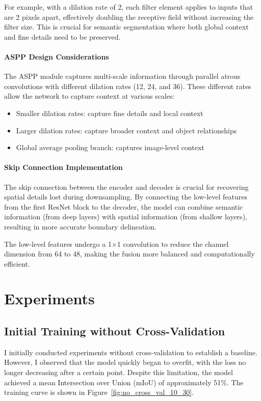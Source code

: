 \documentclass[]{article}
\begin{document}
For example, with a dilation rate of 2, each filter element applies to inputs that are 2 pixels apart, effectively doubling the receptive field without increasing the filter size. This is crucial for semantic segmentation where both global context and fine details need to be preserved.

\paragraph{ASPP Design Considerations}
The ASPP module captures multi-scale information through parallel atrous convolutions with different dilation rates (12, 24, and 36). These different rates allow the network to capture context at various scales:
\begin{itemize}
    \item Smaller dilation rates: capture fine details and local context
    \item Larger dilation rates: capture broader context and object relationships
    \item Global average pooling branch: captures image-level context
\end{itemize}

\paragraph{Skip Connection Implementation}
The skip connection between the encoder and decoder is crucial for recovering spatial details lost during downsampling. By connecting the low-level features from the first ResNet block to the decoder, the model can combine semantic information (from deep layers) with spatial information (from shallow layers), resulting in more accurate boundary delineation.

The low-level features undergo a 1×1 convolution to reduce the channel dimension from 64 to 48, making the fusion more balanced and computationally efficient.

\section{Experiments}
\subsection{Initial Training without Cross-Validation}
I initially conducted experiments without cross-validation to establish a baseline. However, I observed that the model quickly began to overfit, with the loss no longer decreasing after a certain point. Despite this limitation, the model achieved a mean Intersection over Union (mIoU) of approximately 51\%. The training curve is shown in Figure~\ref{fig:no_cross_val_10_30}.
\end{document}
